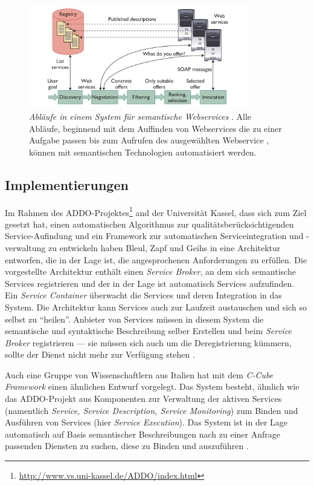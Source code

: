 \begin{figure}[ht]
\centering
\parbox{0.85\textwidth}{
    \includegraphics[width=0.85\textwidth]{media/semantic-ws-client-system.png}
    \caption{\emph{Abläufe in einem System für semantische Webservices} \cite[S.64]{ky-sawsdl}. Alle Abläufe, beginnend mit dem Auffinden von Webservices die zu einer Aufgabe passen bis zum Aufrufen des ausgewählten Webservice , können mit semantischen Technologien automatisiert werden.}
    \label{f:swcs}
}
\end{figure}

\subsection{Implementierungen}

Im Rahmen des \ac{ADDO}-Projektes\footnote{\url{http://www.vs.uni-kassel.de/ADDO/index.html}} and der Universität Kassel, dass sich zum Ziel gesetzt hat, einen automatischen Algorithmus zur qualitätsberücksichtigenden Service-Aufindung und ein Framework zur automatischen Serviceintegration und -verwaltung zu entwickeln haben Bleul, Zapf und Geihs in \cite[S.410ff]{flexbrok} eine Architektur entworfen, die in der Lage ist, die angesprochenen Anforderungen zu erfüllen. Die vorgestellte Architektur enthält einen \emph{Service Broker}, an dem sich semantische Services registrieren und der in der Lage ist automatisch Services aufzufinden. Ein \emph{Service Container} überwacht die Services und deren Integration in das System. Die Architektur kann Services auch zur Laufzeit austauschen und sich so selbst zu "`heilen"'. Anbieter von Services müssen in diesem System die semantische und syntaktische Beschreibung selber Erstellen und beim \emph{Service Broker} registrieren --- sie müssen sich auch um die Deregistrierung kümmern, sollte der Dienst nicht mehr zur Verfügung stehen \cite[S.416]{flexbrok}.

Auch eine Gruppe von Wissenschaftlern aus Italien hat mit dem \emph{C-Cube Framework}\cite{ccube} einen ähnlichen Entwurf vorgelegt. Das System besteht, ähnlich wie das \ac{ADDO}-Projekt aus Komponenten zur Verwaltung der aktiven Services (namentlich \emph{Service, Service Description, Service Monitoring}) zum Binden und Ausführen von Services (hier \emph{Service Execution}). Das System ist in der Lage automatisch auf Basis semantischer Beschreibungen nach zu einer Anfrage passenden Diensten zu suchen, diese zu Binden und auszuführen \cite[S.4]{ccube}.

